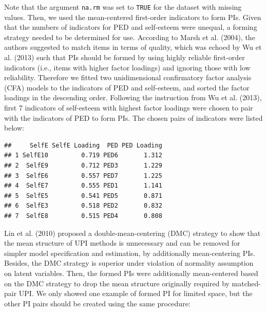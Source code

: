 \documentclass[
  man]{apa7}
\newenvironment{Shaded}{\begin{snugshade}}{\end{snugshade}}
\newcommand{\AttributeTok}[1]{\textcolor[rgb]{0.13,0.29,0.53}{#1}}
\newcommand{\CommentTok}[1]{\textcolor[rgb]{0.56,0.35,0.01}{\textit{#1}}}
\newcommand{\FunctionTok}[1]{\textcolor[rgb]{0.13,0.29,0.53}{\textbf{#1}}}
\newcommand{\NormalTok}[1]{#1}
\newcommand{\OtherTok}[1]{\textcolor[rgb]{0.56,0.35,0.01}{#1}}
\newcommand{\SpecialCharTok}[1]{\textcolor[rgb]{0.81,0.36,0.00}{\textbf{#1}}}
\begin{document}
Note that the argument \texttt{na.rm} was set to \texttt{TRUE} for the dataset with missing values. Then, we used the mean-centered first-order indicators to form PIs. Given that the numbers of indicators for PED and self-esteem were unequal, a forming strategy needed to be determined for use. According to Marsh et al. (2004), the authors suggested to match items in terms of quality, which was echoed by Wu et al. (2013) such that PIs should be formed by using highly reliable first-order indicators (i.e., items with higher factor loadings) and ignoring those with low reliability. Therefore we fitted two unidimensional confirmatory factor analysis (CFA) models to the indicators of PED and self-esteem, and sorted the factor loadings in the descending order. Following the instruction from Wu et al. (2013), first 7 indicators of self-esteem with highest factor loadings were chosen to pair with the indicators of PED to form PIs. The chosen pairs of indicators were listed below:

\begin{verbatim}
##     SelfE SelfE Loading  PED PED Loading
## 1 SelfE10         0.719 PED6       1.312
## 2  SelfE9         0.712 PED3       1.229
## 3  SelfE6         0.557 PED7       1.225
## 4  SelfE7         0.555 PED1       1.141
## 5  SelfE5         0.541 PED5       0.871
## 6  SelfE3         0.518 PED2       0.832
## 7  SelfE8         0.515 PED4       0.808
\end{verbatim}

Lin et al. (2010) proposed a double-mean-centering (DMC) strategy to show that the mean structure of UPI methods is unnecessary and can be removed for simpler model specification and estimation, by additionally mean-centering PIs. Besides, the DMC strategy is superior under violation of normality assumption on latent variables. Then, the formed PIs were additionally mean-centered based on the DMC strategy to drop the mean structure originally required by matched-pair UPI. We only showed one example of formed PI for limited space, but the other PI pairs should be created using the same procedure:

\begin{Shaded}
\end{Shaded}
\end{document}
